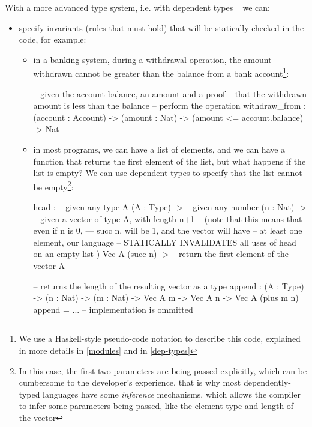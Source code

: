 \documentclass[12pt]{article}
\theoremstyle{definition}
\begin{document}
With a more advanced type system, i.e. with dependent types ~\cite{advancedtapl} we can:
\begin{itemize}

       \item specify invariants (rules that must hold) that will be statically checked in the code, for example:
       \begin{itemize}
              \item in a banking system, during a withdrawal operation, the amount withdrawn cannot be greater than the balance from a bank account\footnote{We use a Haskell-style pseudo-code notation to describe this code, explained in more details in \autoref{modules} and in \autoref{dep-types}}:
             \begin{piforall}
-- given the account balance, an amount and a proof
-- that the withdrawn amount is less than the balance
-- perform the operation
withdraw_from :
       (account : Account) ->
       (amount : Nat) ->
       (amount <= account.balance) ->
       Nat
             \end{piforall}
             \item in most programs, we can have a list of elements, and we can have a function that returns the first element of the list, but what happens if the list is empty? We can use dependent types to specify that the list cannot be empty\footnote{In this case, the first two parameters are being passed explicitly, which can be cumbersome to the developer's experience, that is why most dependently-typed languages have some \emph{inference} mechanisms, which allows the compiler to infer some parameters being passed, like the element type and length of the vector}:
             \begin{piforall}

head :
       -- given any type A
       (A : Type) ->
       -- given any number
       (n : Nat) ->
       -- given a vector of type A, with length n+1
       -- (note that this means that even if n is 0,
       --- succ n, will be 1, and the vector will have
       -- at least one element, our language
       -- STATICALLY INVALIDATES  all uses of head on an empty list )
       Vec A (succ n) ->
       -- return the first element of the vector
       A

-- returns the length of the resulting vector as a type
append : (A : Type) -> (n : Nat) -> (m : Nat) -> Vec A m -> Vec A n -> Vec A (plus m n)
append = ... -- implementation is ommitted
             \end{piforall}
       \end{itemize}


\end{itemize}
\end{document}
